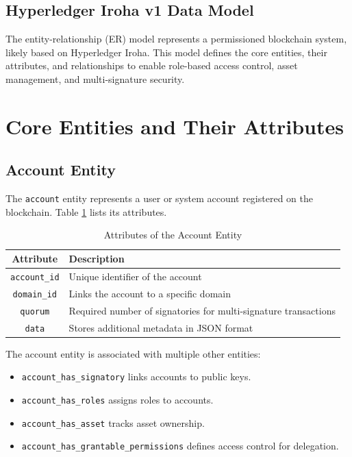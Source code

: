 \documentclass{article}
\begin{document}
\subsection{Hyperledger Iroha v1 Data Model}


The entity-relationship (ER) model represents a permissioned blockchain system, likely based on Hyperledger Iroha. This model defines the core entities, their attributes, and relationships to enable role-based access control, asset management, and multi-signature security.

\section{Core Entities and Their Attributes}
\subsection{Account Entity}
The \texttt{account} entity represents a user or system account registered on the blockchain. Table \ref{tab:account_attributes} lists its attributes.

\begin{table}[h]
    \centering
    \caption{Attributes of the Account Entity}
    \label{tab:account_attributes}
    \begin{tabular}{|c|l|}
        \hline
        \textbf{Attribute}   & \textbf{Description}                                            \\ \hline
        \texttt{account\_id} & Unique identifier of the account                                \\ \hline
        \texttt{domain\_id}  & Links the account to a specific domain                          \\ \hline
        \texttt{quorum}      & Required number of signatories for multi-signature transactions \\ \hline
        \texttt{data}        & Stores additional metadata in JSON format                       \\ \hline
    \end{tabular}
\end{table}

The account entity is associated with multiple other entities:
\begin{itemize}
    \item \texttt{account\_has\_signatory} links accounts to public keys.
    \item \texttt{account\_has\_roles} assigns roles to accounts.
    \item \texttt{account\_has\_asset} tracks asset ownership.
    \item \texttt{account\_has\_grantable\_permissions} defines access control for delegation.
\end{itemize}
\end{document}
